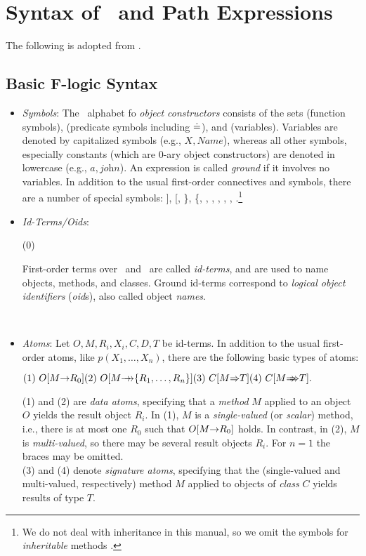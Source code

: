 \section{Syntax of \fl\ and Path Expressions }

The following is adopted from \cite{ludaescher-himmeroeder-IS-98}.


\subsection{Basic F-logic Syntax}\label{sec-basic-flogic}


\begin{itemize}
\item \emph{Symbols}: The \fl\ alphabet fo \emph{object constructors}
  consists of the sets \funcs (function symbols), \preds (predicate symbols
  including $\doteq$), and \vars (variables).  Variables are denoted by
  capitalized symbols (e.g., $X,\textit{Name}$), whereas all other symbols,
  especially constants (which are 0-ary object constructors) are denoted in
  lowercase (e.g., $a,\textit{john}$).  An expression is called
  \emph{ground} if it involves no variables.  In addition to the usual
  first-order connectives and symbols, there are a number of special
  symbols: ], [, \}, \{, \fd, \mvd, \Fd, \Mvd,
  \isa, \subcl.\footnote{
    We do not deal with inheritance in this manual, so we
    omit the symbols for \emph{inheritable} methods
    \cite{KLW93}.
    }
\item \emph{Id-Terms/Oids}:  \medskip
  
  \hfill (0)
  \begin{minipage}[t]{.80\textwidth}
    First-order terms over \funcs\ and \vars\ are called
    \emph{id-terms}, and are used to name objects, methods, and
    classes.  Ground id-terms correspond to \emph{logical object
      identifiers} (\emph{oid}s), also called object \emph{names}.
  \end{minipage}
  \hfill ~
\item \emph{Atoms}: Let $O,M,R_{i},X_{i},C,D,T$ be id-terms.  In
  addition to the usual first-order atoms, like $p(X_1,\dots,X_n)$, there
  are the following basic types of atoms: \medskip

  \begin{math}
    \hfill (1)~O[M\fd R_0] \hfill (2)~O[M\mvd \{R_1,\dots,R_n\}]
    \hfill (3)~C[M\Fd T] \hfill (4)~C[M\Mvd T]. \hfill
  \end{math} \medskip
  
  (1) and (2) are \emph{data atoms}, specifying that a \emph{method} $M$
  applied to an object $O$ yields the result object $R_i$. In (1), $M$ is a
  \emph{single-valued} (or \emph{scalar}) method, i.e., there is
  at most one $R_0$ such that $O[M{\rightarrow} R_0]$ holds. In contrast, in
  (2), $M$ is \emph{multi-valued}, so there may be several result
  objects $R_i$. For $n=1$ the braces may be omitted.\\
  (3) and (4) denote \emph{signature atoms}, specifying that the
  (single-valued and multi-valued, respectively) method $M$ applied to
  objects of \emph{class} $C$ yields results of type $T$.
  

\end{itemize}

